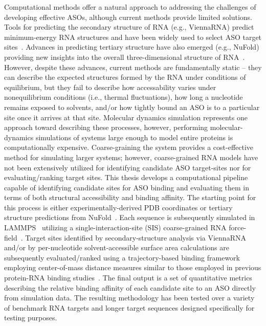 Computational methods offer a natural approach to addressing the challenges of developing effective ASOs, although current methods provide limited solutions. Tools for predicting the secondary structure of RNA (e.g., ViennaRNA) predict minimum-energy RNA structures and have been widely used to select ASO target sites~\cite{Lorenz2011, Mathews2004}. Advances in predicting tertiary structure have also emerged (e.g., NuFold) providing new insights into the overall three-dimensional structure of RNA~\cite{Kagaya2025}. However, despite these advances, current methods are fundamentally static -- they can describe the expected structures formed by the RNA under conditions of equilibrium, but they fail to describe how accessability varies under nonequilibrium conditions (i.e., thermal fluctuations), how long a nucleotide remains exposed to solvents, and/or how tightly bound an ASO is to a particular site once it arrives at that site. Molecular dynamics simulation represents one approach toward describing these processes, however, performing molecular-dynamics simulations of systems large enough to model entire proteins is computationally expensive. Coarse-graining the system provides a cost-effective method for simulating larger systems; however, coarse-grained RNA models have not been extensively utilized for identifying candidate ASO target-sites nor for evaluating/ranking target sites.
This thesis develops a computational pipeline capable of identifying candidate sites for ASO binding and evaluating them in terms of both structural accessibility and binding affinity. The starting point for this process is either experimentally-derived PDB coordinates or tertiary structure predictions from NuFold~\cite{Kagaya2025}. Each sequence is subsequently simulated in LAMMPS~\cite{Thompson2022} utilizing a single-interaction-site (SIS) coarse-grained RNA force-field~\cite{Aierken2024}. Target sites identified by secondary-structure analysis via ViennaRNA and/or by per-nucleotide solvent-accessible surface area calculations are subsequently evaluated/ranked using a trajectory-based binding framework employing center-of-mass distance measures similar to those employed in previous protein-RNA binding studies~\cite{Alston2023, Tesei2021}. The final output is a set of quantitative metrics describing the relative binding affinity of each candidate site to an ASO directly from simulation data. The resulting methodology has been tested over a variety of benchmark RNA targets and longer target sequences designed specifically for testing purposes.
